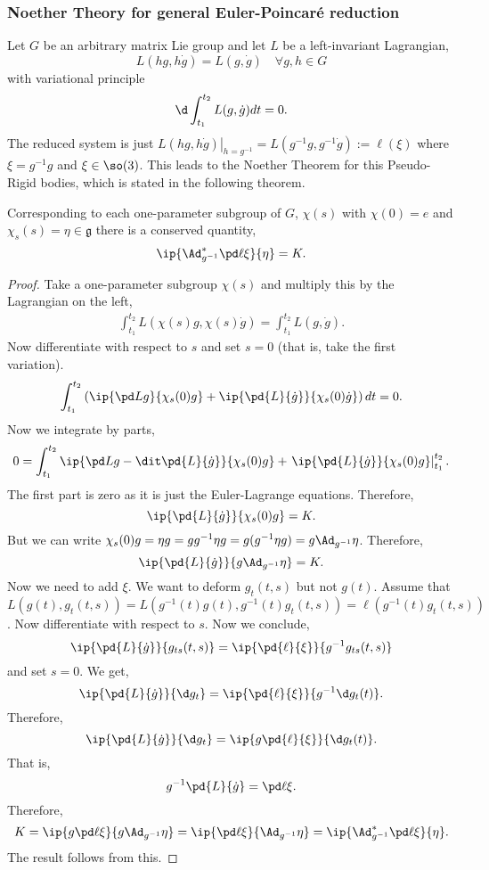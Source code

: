 \subsubsection{Noether Theory for general Euler-Poincar\'e reduction}
Let $G$ be an arbitrary matrix Lie group and let $L$ be a left-invariant Lagrangian,
$$ L(hg, h\dot g) = L(g, \dot g) \quad \forall g, h \in G$$
with variational principle
$$ \d \int_{t_1}^{t_2} L(g, \dot g)dt = 0. $$
The reduced system is just $\left.L(hg, h\dot g)\right|_{h = g^{-1}} = L(g^{-1}g, g^{-1}\dot g) := \ell(\xi)$ where $\xi = g^{-1}g$ and $\xi \in \so(3)$. This leads to the Noether Theorem for this Pseudo-Rigid bodies, which is stated in the following theorem.
\begin{nthm}
  Corresponding to each one-parameter subgroup of $G$, $\chi(s)$ with $\chi(0) = e$ and $\chi_s (s) = \eta \in \mathfrak{g}$ there is a conserved quantity,
  $$ \ip{\Ad^*_{g^{-1}} \pd \ell \xi}{\eta} = K. $$
\end{nthm}
\begin{proof}
  Take a one-parameter subgroup $\chi(s)$ and multiply this by the Lagrangian on the left,
  \begin{align*}
    \int_{t_1}^{t_2} L(\chi(s)g, \chi(s)\dot g) = \int_{t_1}^{t_2} L(g, \dot g).
  \end{align*}
  Now differentiate with respect to $s$ and set $s = 0$ (that is, take the first variation).
  $$ \int_{t_1}^{t_2} \left(\ip{\pd L g}{\chi_s(0)g} + \ip{\pd{L}{\dot g}}{\chi_s(0)\dot g}\right)dt = 0. $$
  Now we integrate by parts,
  $$ 0 = \int_{t_1}^{t_2} \ip{\pd L g - \dit \pd{L}{\dot g}}{\chi_s(0)g} + \left.\ip{\pd{L}{\dot g}}{\chi_s(0)g}\right|_{t_1}^{t_2}. $$
  The first part is zero as it is just the Euler-Lagrange equations. Therefore,
  $$ \ip{\pd{L}{\dot g}}{\chi_s(0)g} = K. $$
  But we can write $\chi_s(0)g = \eta g = gg^{-1}\eta g = g(g^{-1}\eta g) = g\Ad_{g^{-1}}\eta$. Therefore,
  $$ \ip{\pd{L}{\dot g}}{g\Ad_{g^{-1}}\eta} = K. $$
  Now we need to add $\xi$. We want to deform $g_t(t, s)$ but not $g(t)$. Assume that $L(g(t), g_t(t, s)) = L(g^{-1}(t)g(t),  g^{-1}(t)g_t(t, s)) = \ell(g^{-1}(t)g_t(t,s))$. Now differentiate with respect to $s$. Now we conclude,
  $$ \ip{\pd{L}{\dot g}}{g_{ts}(t, s)} = \ip{\pd{\ell}{\xi}}{g^{-1}g_{ts}(t, s)} $$
  and set $s = 0$. We get,
  $$ \ip{\pd{L}{\dot g}}{\d g_{t}} = \ip{\pd{\ell}{\xi}}{g^{-1}\d g_{t}(t)}. $$
  Therefore,
  $$ \ip{\pd{L}{\dot g}}{\d g_{t}} = \ip{g\pd{\ell}{\xi}}{\d g_{t}(t)}. $$
  That is,
  $$ g^{-1}\pd{L}{\dot g} = \pd \ell \xi. $$
  Therefore,
  $$ K = \ip{g\pd \ell \xi}{g\Ad_{g^{-1}}\eta} = \ip{\pd \ell \xi}{\Ad_{g^{-1}}\eta} = \ip{\Ad^*_{g^{-1}}\pd \ell \xi}{\eta}. $$
  The result follows from this.
\end{proof}

